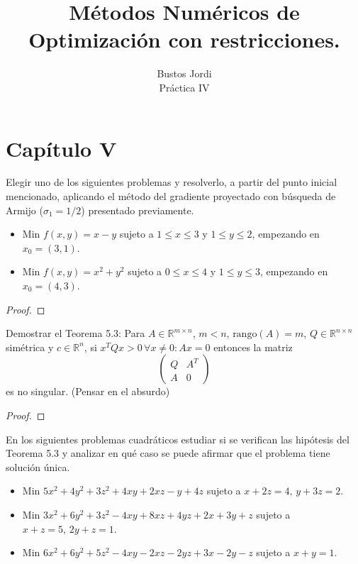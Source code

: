 \documentclass{article}
\newenvironment{theorem}[2][Ejercicio]{\begin{trivlist}
\item[\hskip \labelsep {\bfseries #1}\hskip \labelsep {\bfseries #2.}]}{\end{trivlist}}
\begin{document}
\title{Métodos Numéricos de Optimización con restricciones.}
\author{Bustos Jordi\\Práctica IV}

\maketitle

\section*{Capítulo V}
\begin{theorem}{1}
    Elegir uno de los siguientes problemas y resolverlo, a partir del punto inicial mencionado, aplicando el método del gradiente proyectado con búsqueda de Armijo (\(\sigma_1 = 1/2\)) presentado previamente.
    \begin{itemize}
        \item Min \(f(x,y) = x - y\) sujeto a \(1 \leq x \leq 3\) y \( 1 \leq y \leq 2\), empezando en \(x_0 = (3,1)\).
        \item Min \(f(x,y) = x^2 + y^2 \) sujeto a \( 0 \leq x \leq 4 \) y \( 1 \leq y \leq 3 \), empezando en \(x_0 = (4, 3)\).
    \end{itemize}
\end{theorem}

\begin{proof}

\end{proof}

\begin{theorem}{2}
    Demostrar el Teorema 5.3: Para \(A \in \mathbb{R}^{m \times n}\), \(m < n\), \(\text{rango}(A) = m\), \(Q \in \mathbb{R}^{n \times n}\) simétrica y \(c \in \mathbb{R}^n\), si \(x^T Q x > 0 \, \forall x \neq 0 : Ax = 0\) entonces la matriz
    \[
        \begin{pmatrix}
            Q & A^T \\
            A & 0
        \end{pmatrix}
    \]
    es no singular. (Pensar en el absurdo)
\end{theorem}

\begin{proof}

\end{proof}

\begin{theorem}{3}
    En los siguientes problemas cuadráticos estudiar si se verifican las hipótesis del Teorema 5.3 y analizar en qué caso se puede afirmar que el problema tiene solución única.
    \begin{itemize}
        \item[(a)] Min \( 5x^2 + 4y^2 + 3z^2 + 4xy + 2xz - y + 4z \) sujeto a \( x + 2z = 4, \, y + 3z = 2 \).
        \item[(b)] Min \( 3x^2 + 6y^2 + 3z^2 - 4xy + 8xz + 4yz + 2x + 3y + z \) sujeto a \( x + z = 5, \, 2y + z = 1 \).
        \item[(c)] Min \( 6x^2 + 6y^2 + 5z^2 - 4xy - 2xz - 2yz + 3x - 2y - z \) sujeto a \( x + y = 1 \).
    \end{itemize}
\end{theorem}
\end{document}
